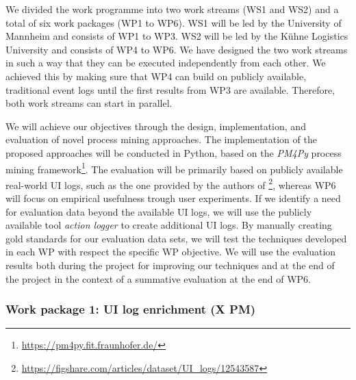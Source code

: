  We divided the work programme into two work streams (WS1 and WS2) and a total of six work packages (WP1 to WP6). WS1 will be led by the University of Mannheim and consists of WP1 to WP3. WS2 will be led by the Kühne Logistics University and consists of WP4 to WP6. We have designed the two work streams in such a way that they can be executed independently from each other. We achieved this by making sure that WP4 can build on publicly available, traditional event logs until the first results from WP3 are available. Therefore, both work streams can start in parallel. 

 We will achieve our objectives through the design, implementation, and evaluation of novel process mining approaches. The implementation of the proposed approaches will be conducted in Python, based on the \textit{PM4Py} process mining framework\footnote{\url{https://pm4py.fit.fraunhofer.de/}}. The evaluation will be primarily based on publicly available real-world UI logs, such as the one provided by the authors of \cite{leno2020identifying}\footnote{\url{https://figshare.com/articles/dataset/UI\_logs/12543587}}, whereas WP6 will focus on empirical usefulness trough user experiments. If we identify a need for evaluation data beyond the available UI logs, we will use the publicly available tool \textit{action logger} \cite{leno2019action} to create additional UI logs. By manually creating gold standards for our evaluation data sets, we will test the techniques developed in each WP with respect the specific WP objective. We will use the evaluation results both during the project for improving our techniques and at the end of the project in the context of a summative evaluation at the end of WP6. 

\subsubsection{Work package 1: UI log enrichment (X PM)}
\label{sec:wp1}

